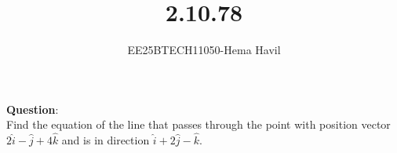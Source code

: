\documentclass[journal]{IEEEtran}
\begin{document}

\vspace{3cm}
\title{2.10.78}
\author{EE25BTECH11050-Hema Havil}
	\maketitle
	{\let\newpage\relax\maketitle}
	
	\renewcommand{\thefigure}{\theenumi}
	\renewcommand{\thetable}{\theenumi}
	\setlength{\intextsep}{12pt} %
	
	\renewcommand{\thetable}{\theenumi}
	
	\textbf{Question}:\\
    
         Find the equation of the line that passes through the point with position vector
        $2\hat{i}-\hat{j}+4\hat{k}$ and is in direction $\hat{i}+2\hat{j}-\hat{k}$.
         
\end{document}
